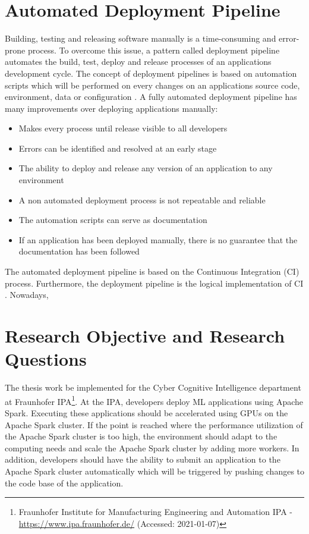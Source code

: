 \section{Automated Deployment Pipeline}
Building, testing and releasing software manually is a time-consuming and error-prone process.
To overcome this issue, a pattern called deployment pipeline automates the build, test, deploy and release processes of an applications development cycle.
The concept of deployment pipelines is based on automation scripts which will be performed on every changes on an applications source code, environment, data or configuration \cite{Farley2010CI}.
A fully automated deployment pipeline has many improvements over deploying applications manually:
\begin{itemize}
\item Makes every process until release visible to all developers \cite{Farley2010CI}
\item Errors can be identified and resolved at an early stage \cite{Farley2010CI}
\item The ability to deploy and release any version of an application to any environment \cite{Farley2010CI}
\item A non automated deployment process is not repeatable and reliable \cite{Farley2010CI}
\item The automation scripts can serve as documentation \cite{Farley2010CI}
\item If an application has been deployed manually, there is no guarantee that the documentation has been followed \cite{Farley2010CI}
\end{itemize}
The automated deployment pipeline is based on the Continuous Integration (CI) process. Furthermore, the deployment pipeline is the logical implementation of CI \cite{Farley2010CI}.
Nowadays, 


\section{Research Objective and Research Questions}
The thesis work be implemented for the Cyber Cognitive Intelligence department at Fraunhofer IPA\footnote{Fraunhofer Institute for Manufacturing Engineering and Automation IPA - \url{https://www.ipa.fraunhofer.de/} (Accessed: 2021-01-07)}.
At the IPA, developers deploy ML applications using Apache Spark.
Executing these applications should be accelerated using GPUs on the Apache Spark cluster.
If the point is reached where the performance utilization of the Apache Spark cluster is too high, the environment should adapt to the computing needs and scale the Apache Spark cluster by adding more workers.
In addition, developers should have the ability to submit an application to the Apache Spark cluster automatically which will be triggered by pushing changes to the code base of the application.


